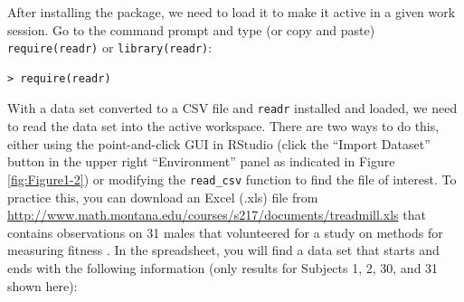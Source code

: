 \documentclass[]{book}
\renewcommand{\indent}{\hspace{15pt}}
\begin{document}
\indent After installing the package, we need to load it to make it active in a given work
session. Go to the command prompt and type (or copy and paste) \texttt{require(readr)} or \texttt{library(readr)}:

\begin{verbatim}
> require(readr)
\end{verbatim}

With a data set converted to a CSV file and \texttt{readr} installed and loaded, we need to read the data set into the active workspace.
There are two ways to do this, either using the point-and-click GUI in RStudio (click
the ``Import Dataset'' button in the upper right ``Environment'' panel as
indicated in Figure \ref{fig:Figure1-2}) or modifying the \texttt{read\_csv}
function to find the file of interest. To practice this, you can
download an Excel (.xls) file from
\url{http://www.math.montana.edu/courses/s217/documents/treadmill.xls}
that contains observations on 31 males that volunteered for a study on methods
for measuring fitness \citep{Westfall1993}.
In the spreadsheet, you will find a data set that
starts and ends with the following information (only results for Subjects 1, 2,
30, and 31 shown here):
\end{document}

